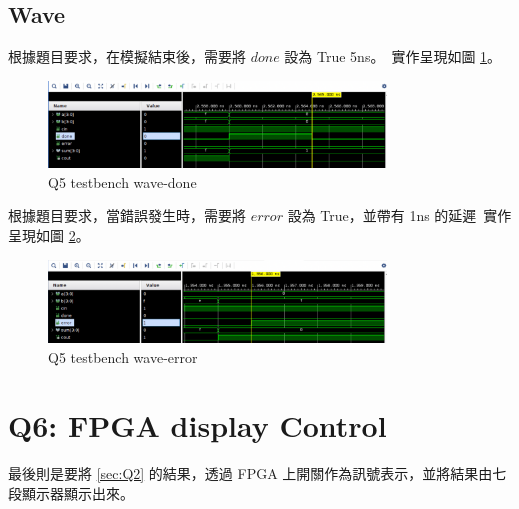 \documentclass[10.5pt,compsoc,UTF8]{CjC}
\theoremstyle{mystyle}
\begin{document}
\subsection{Wave}

根據題目要求，在模擬結束後，需要將 $done$ 設為 True 5ns。\
實作呈現如圖 \ref{fig:Q5_wave1}。

\begin{figure}[htp]
  \centering
  \includegraphics[width=0.8\textwidth]{Q5-wave1.png}
  \caption{Q5 testbench wave-done}
  \label{fig:Q5_wave1}
\end{figure}

根據題目要求，當錯誤發生時，需要將 $error$ 設為 True，並帶有 1ns 的延遲\
實作呈現如圖 \ref{fig:Q5_wave2}。\ 

\begin{figure}[htp]
  \centering
  \includegraphics[width=0.8\textwidth]{Q5-wave2.png}
  \caption{Q5 testbench wave-error}
  \label{fig:Q5_wave2}
\end{figure}

\newpage

\section{Q6: FPGA display Control}
最後則是要將 \ref{sec:Q2} 的結果，透過 FPGA 上開關作為訊號表示，並將結果由七段顯示器顯示出來。
\end{document}
